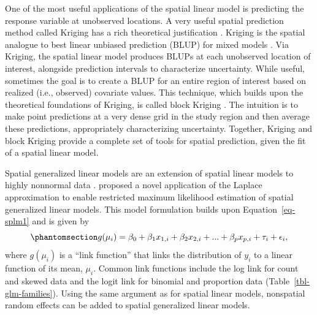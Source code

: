 \documentclass[
  letterpaper,
  DIV=11,
  numbers=noendperiod]{scrartcl}
\begin{document}
One of the most useful applications of the spatial linear model is
predicting the response variable at unobserved locations. A very useful
spatial prediction method called Kriging has a rich theoretical
justification \citep{cressie1990origins, stein1999interpolation}.
Kriging is the spatial analogue to best linear unbiased prediction
(BLUP) for mixed models \citep{henderson1975best}. Via Kriging, the
spatial linear model produces BLUPs at each unobserved location of
interest, alongside prediction intervals to characterize uncertainty.
While useful, sometimes the goal is to create a BLUP for an entire
region of interest based on realized (i.e., observed) covariate values.
This technique, which builds upon the theoretical foundations of
Kriging, is called block Kriging
\citep{ver2002sampling, cressie2006block}. The intuition is to make
point predictions at a very dense grid in the study region and then
average these predictions, appropriately characterizing uncertainty.
Together, Kriging and block Kriging provide a complete set of tools for
spatial prediction, given the fit of a spatial linear model.

Spatial generalized linear models are an extension of spatial linear
models to highly nonnormal data
\citep{christensen2002bayesian, zhang2002estimation, diggle2007model, bonat2016practical}.
\citet{verhoef2024marginal} proposed a novel application of the Laplace
approximation to enable restricted maximum likelihood estimation of
spatial generalized linear models. This model formulation builds upon
Equation~\ref{eq-splm1} and is given by
\begin{equation}\phantomsection\label{eq-spglm1}{
g(\mu_i) = \beta_0 + \beta_1x_{1, i} + \beta_2x_{2, i} + ... + \beta_p x_{p, i} + \tau_i + \epsilon_i,
}\end{equation} where \(g(\mu_i)\) is a ``link function'' that links the
distribution of \(y_i\) to a linear function of its mean, \(\mu_i\).
Common link functions include the log link for count and skewed data and
the logit link for binomial and proportion data
(Table~\ref{tbl-glm-families}). Using the same argument as for spatial
linear models, nonspatial random effects can be added to spatial
generalized linear models.
\end{document}
